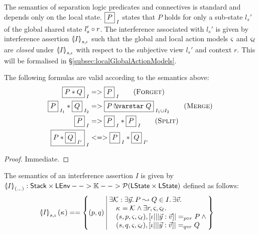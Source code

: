 
The semantics of separation logic predicates and connectives is
standard and depends only on the local state.  $\shared{P}{I}$ states
that $P$ holds for only a sub-state $l_s'$ of the global shared state
$l_s'\composeL r$. The interference associated with $l_s'$ is given by
interference assertion $\semI[s,\lenv]{I}$ such that the global and
local action models $\amod{}$ and $\amod{\ell}$ are \emph{closed}
under $\semI[s,\lenv]{I}$ with respect to the subjective view $l_s'$ and
context $r$. This will be formalised in \S\ref{subsec:localGlobalActionModels}.

\begin{lemma}
  \label{lem:assertionFacts}
  The following formulas are valid according to the semantics above:
  \begin{align*}
  \shared{P * Q}{I} &=> \shared{P}{I}  \tag{\textsc{Forget}}\\
  \shared{P}{I_1} * \shared{Q}{I_2} &=> \shared{P \sepish Q}{I_1 \cup I_2} \tag{\textsc{Merge}}\\
  \shared{P}{I} &=> \shared{P}{I} * \shared P I \tag{\textsc{Split}}\\
  \shared{P * \shared{Q}{I'}}{I} &<=> \shared{P}{I} * \shared{Q}{I'}
  \end{align*}
\end{lemma}
\begin{proof}
  Immediate.
\end{proof}

\begin{definition}
  \label{def:interferenceSemantics}
  The semantics of an interference assertion $I$ is given by
  $
  \semI[(.,.)]{I} : \set{Stack}\times\LEnv -->
  \Caps -->  \powerset(\LStates \times \LStates)
  $
  defined as follows:
  \begin{align*}
  \semI[s,\lenv]{I}(\ca{}) &==
  \left\{
  \begin{array}{@{}l@{\ }|@{\ }r@{}}
    (p, q)&
    \begin{array}{@{}l@{}}
      \exsts{\interAss{\capAss{}}{\vec{y}}{P}{Q} \in I} \exsts{\vec{v}}\null\\
      \quad\ca{} = \capAss{} \land\exsts{r, \amod{}, \amod{\ell}}\\
      \quad (s,p,\amod{}, \amod{\ell}),[\lenv|||\vec y:\vec v] |=_{p \composeL r} P \land\null\\
      \quad (s,q,\amod{}, \amod{\ell}),[\lenv|||\vec y:\vec v] |=_{q \composeL r} Q
    \end{array}
  \end{array}
  \right\}
  \end{align*}
\end{definition}



